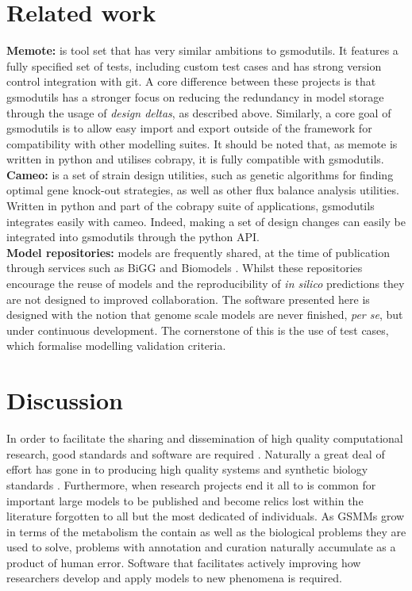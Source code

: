 \documentclass[a4paper,10pt]{article}
\begin{document}
\section{Related work}
\textbf{Memote:} \cite{lieven2017memote} is tool set that has very similar ambitions to gsmodutils.
It features a fully specified set of tests, including custom test cases and has strong version control integration with git.
A core difference between these projects is that gsmodutils has a stronger focus on reducing the redundancy in model storage through the usage of \textit{design deltas}, as described above.
Similarly, a core goal of gsmodutils is to allow easy import and export outside of the framework for compatibility with other modelling suites.
It should be noted that, as memote is written in python and utilises cobrapy, it is fully compatible with gsmodutils.
\\
\textbf{Cameo:} \cite{cardoso2017cameo} is a set of strain design utilities, such as genetic algorithms for finding optimal gene knock-out
strategies, as well as other flux balance analysis utilities. Written in python and part of the cobrapy suite of applications,
gsmodutils integrates easily with cameo.
Indeed, making a set of design changes can easily be integrated into gsmodutils through the python API.
\\
\textbf{Model repositories:} models are frequently shared, at the time of publication through services such as BiGG \cite{king2015bigg} and Biomodels \cite{chelliah2013biomodels}. 
Whilst these repositories encourage the reuse of models and the reproducibility of \textit{in silico} predictions they are not designed to improved collaboration.
The software presented here is designed with the notion that genome scale models are never finished, \textit{per se}, but under continuous development.
The cornerstone of this is the use of test cases, which formalise modelling validation criteria.


\section{Discussion}
In order to facilitate the sharing and dissemination of high quality computational research, good standards and software are required \cite{jimenez2017four}.
Naturally a great deal of effort has gone in to producing high quality systems and synthetic biology standards \cite{hucka2003systems, cox2018synthetic}.
Furthermore, when research projects end it all to is common for important large models to be published and become relics lost within the literature forgotten to all but the most dedicated of individuals.
As GSMMs grow in terms of the metabolism the contain as well as the biological problems they are used to solve, problems with annotation and curation naturally accumulate as a product of human error.
Software that facilitates actively improving how researchers develop and apply models to new phenomena is required.
\end{document}
